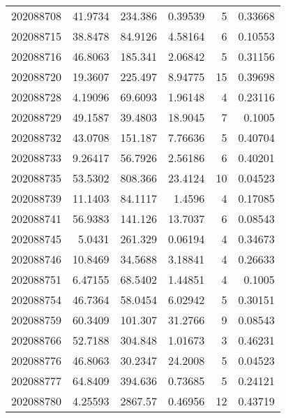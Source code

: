 \begin{tabular}{rrrrrr}
 202088708 &         41.9734  &      234.386  &            0.39539 &           5 & 0.33668 \\
 202088715 &         38.8478  &       84.9126 &            4.58164 &           6 & 0.10553 \\
 202088716 &         46.8063  &      185.341  &            2.06842 &           5 & 0.31156 \\
 202088720 &         19.3607  &      225.497  &            8.94775 &          15 & 0.39698 \\
 202088728 &          4.19096 &       69.6093 &            1.96148 &           4 & 0.23116 \\
 202088729 &         49.1587  &       39.4803 &           18.9045  &           7 & 0.1005  \\
 202088732 &         43.0708  &      151.187  &            7.76636 &           5 & 0.40704 \\
 202088733 &          9.26417 &       56.7926 &            2.56186 &           6 & 0.40201 \\
 202088735 &         53.5302  &      808.366  &           23.4124  &          10 & 0.04523 \\
 202088739 &         11.1403  &       84.1117 &            1.4596  &           4 & 0.17085 \\
 202088741 &         56.9383  &      141.126  &           13.7037  &           6 & 0.08543 \\
 202088745 &          5.0431  &      261.329  &            0.06194 &           4 & 0.34673 \\
 202088746 &         10.8469  &       34.5688 &            3.18841 &           4 & 0.26633 \\
 202088751 &          6.47155 &       68.5402 &            1.44851 &           4 & 0.1005  \\
 202088754 &         46.7364  &       58.0454 &            6.02942 &           5 & 0.30151 \\
 202088759 &         60.3409  &      101.307  &           31.2766  &           9 & 0.08543 \\
 202088766 &         52.7188  &      304.848  &            1.01673 &           3 & 0.46231 \\
 202088776 &         46.8063  &       30.2347 &           24.2008  &           5 & 0.04523 \\
 202088777 &         64.8409  &      394.636  &            0.73685 &           5 & 0.24121 \\
 202088780 &          4.25593 &     2867.57   &            0.46956 &          12 & 0.43719 \\

\end{tabular}
